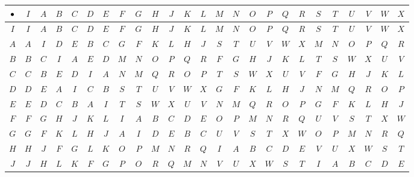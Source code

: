 \documentclass[../key.tex]{subfiles}
\begin{document}
\begin{figure}[h]
	\begin{center}
		\begin{minipage}[b]{\textwidth}
			\centering
			\setlength{\tabcolsep}{2pt}
			\begin{tabular}{c|acccacccacccacccacccaccc}
				\hline
				$\bullet$ & $I$ & $A$ & $B$ & $C$ & $D$ & $E$ & $F$ & $G$ & $H$ & $J$ & $K$ & $L$ & $M$ & $N$ & $O$ & $P$ & $Q$ & $R$ & $S$ & $T$ & $U$ & $V$ & $W$ & $X$ \\ \hline
				$I$ & $I$ & $A$ & $B$ & $C$ & $D$ & $E$ & $F$ & $G$ & $H$ & $J$ & $K$ & $L$ & $M$ & $N$ & $O$ & $P$ & $Q$ & $R$ & $S$ & $T$ & $U$ & $V$ & $W$ & $X$ \\
				$A$ & $A$ & $I$ & $D$ & $E$ & $B$ & $C$ & $G$ & $F$ & $K$ & $L$ & $H$ & $J$ & $S$ & $T$ & $U$ & $V$ & $W$ & $X$ & $M$ & $N$ & $O$ & $P$ & $Q$ & $R$ \\
				$B$ & $B$ & $C$ & $I$ & $A$ & $E$ & $D$ & $M$ & $N$ & $O$ & $P$ & $Q$ & $R$ & $F$ & $G$ & $H$ & $J$ & $K$ & $L$ & $T$ & $S$ & $W$ & $X$ & $U$ & $V$ \\
				$C$ & $C$ & $B$ & $E$ & $D$ & $I$ & $A$ & $N$ & $M$ & $Q$ & $R$ & $O$ & $P$ & $T$ & $S$ & $W$ & $X$ & $U$ & $V$ & $F$ & $G$ & $H$ & $J$ & $K$ & $L$ \\
				$D$ & $D$ & $E$ & $A$ & $I$ & $C$ & $B$ & $S$ & $T$ & $U$ & $V$ & $W$ & $X$ & $G$ & $F$ & $K$ & $L$ & $H$ & $J$ & $N$ & $M$ & $Q$ & $R$ & $O$ & $P$ \\
				$E$ & $E$ & $D$ & $C$ & $B$ & $A$ & $I$ & $T$ & $S$ & $W$ & $X$ & $U$ & $V$ & $N$ & $M$ & $Q$ & $R$ & $O$ & $P$ & $G$ & $F$ & $K$ & $L$ & $H$ & $J$ \\
				$F$ & $F$ & $G$ & $H$ & $J$ & $K$ & $L$ & $I$ & $A$ & $B$ & $C$ & $D$ & $E$ & $O$ & $P$ & $M$ & $N$ & $R$ & $Q$ & $U$ & $V$ & $S$ & $T$ & $X$ & $W$ \\
				$G$ & $G$ & $F$ & $K$ & $L$ & $H$ & $J$ & $A$ & $I$ & $D$ & $E$ & $B$ & $C$ & $U$ & $V$ & $S$ & $T$ & $X$ & $W$ & $O$ & $P$ & $M$ & $N$ & $R$ & $Q$ \\
				$H$ & $H$ & $J$ & $F$ & $G$ & $L$ & $K$ & $O$ & $P$ & $M$ & $N$ & $R$ & $Q$ & $I$ & $A$ & $B$ & $C$ & $D$ & $E$ & $V$ & $U$ & $X$ & $W$ & $S$ & $T$ \\
				$J$ & $J$ & $H$ & $L$ & $K$ & $F$ & $G$ & $P$ & $O$ & $R$ & $Q$ & $M$ & $N$ & $V$ & $U$ & $X$ & $W$ & $S$ & $T$ & $I$ & $A$ & $B$ & $C$ & $D$ & $E$ \\

\end{tabular}
\end{minipage}
\end{center}
\end{figure}
\end{document}
